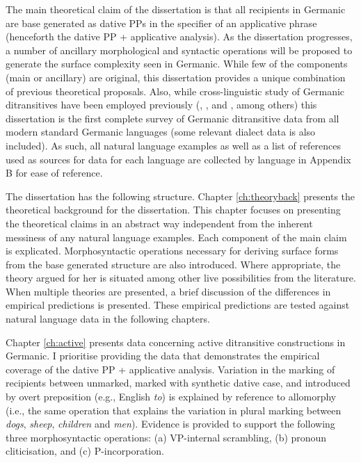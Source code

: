 The main theoretical claim of the dissertation is that all recipients in Germanic are base generated as dative PPs in the specifier of an applicative phrase (henceforth the dative PP + applicative analysis). As the dissertation progresses, a number of ancillary morphological and syntactic operations will be proposed to generate the surface complexity seen in Germanic. While few of the components (main or ancillary) are original, this dissertation provides a unique combination of previous theoretical proposals. Also, while cross-linguistic study of Germanic ditransitives have been employed previously (\citealt{Falk.1990}, \citealt{Sprouse.1995}, and \citealt{Holmberg.1995}, among others) this dissertation is the first complete survey of Germanic ditransitive data from all modern standard Germanic languages (some relevant dialect data is also included). As such, all natural language examples as well as a list of references used as sources for data for each language are collected by language in Appendix B for ease of reference.

The dissertation has the following structure. Chapter \ref{ch:theoryback} presents the theoretical background for the dissertation. This chapter focuses on presenting the theoretical claims in an abstract way independent from the inherent messiness of any natural language examples. Each component of the main claim is explicated. Morphosyntactic operations necessary for deriving surface forms from the base generated structure are also introduced. Where appropriate, the theory argued for her is situated among other live possibilities from the literature. When multiple theories are presented, a brief discussion of the differences in empirical predictions is presented. These empirical predictions are tested against natural language data in the following chapters.

Chapter \ref{ch:active} presents data concerning active ditransitive constructions in Germanic. I prioritise providing the data that demonstrates the empirical coverage of the dative PP + applicative analysis. Variation in the marking of recipients between unmarked, marked with synthetic dative case, and introduced by overt preposition (e.g., English \textit{to}) is explained by reference to allomorphy (i.e., the same operation that explains the variation in plural marking between \textit{dogs}, \textit{sheep}, \textit{children} and \textit{men}). Evidence is provided to support the following three morphosyntactic operations: (a) VP-internal scrambling, (b) pronoun cliticisation, and (c) P-incorporation. 

